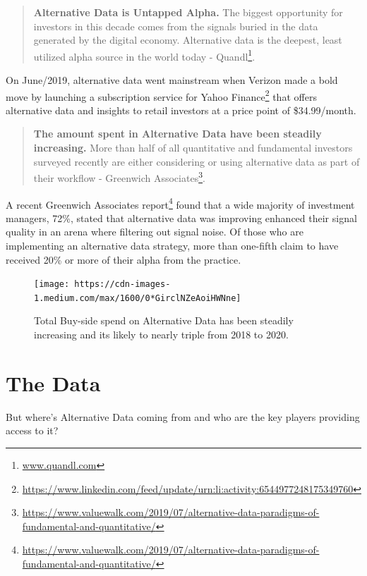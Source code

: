 \documentclass[]{book}
\DeclareRobustCommand{\href}[2]{#2\footnote{\url{#1}}}
\theoremstyle{definition}
\theoremstyle{definition}
\theoremstyle{definition}
\theoremstyle{remark}
\begin{document}
\begin{quote}
\textbf{Alternative Data is Untapped Alpha.} The biggest opportunity for
investors in this decade comes from the signals buried in the data
generated by the digital economy. Alternative data is the deepest, least
utilized alpha source in the world today -
\href{www.quandl.com}{Quandl}.
\end{quote}

On June/2019, alternative data went mainstream when Verizon made a bold
move by launching a
\href{https://www.linkedin.com/feed/update/urn:li:activity:6544977248175349760}{subscription
service for Yahoo Finance} that offers alternative data and insights to
retail investors at a price point of \$34.99/month.

\begin{quote}
\textbf{The amount spent in Alternative Data have been steadily
increasing.} More than half of all quantitative and fundamental
investors surveyed recently are either considering or using alternative
data as part of their workflow -
\href{https://www.valuewalk.com/2019/07/alternative-data-paradigms-of-fundamental-and-quantitative/}{Greenwich
Associates}.
\end{quote}

A recent
\href{https://www.valuewalk.com/2019/07/alternative-data-paradigms-of-fundamental-and-quantitative/}{Greenwich
Associates report} found that a wide majority of investment managers,
72\%, stated that alternative data was improving enhanced their signal
quality in an arena where filtering out signal noise. Of those who are
implementing an alternative data strategy, more than one-fifth claim to
have received 20\% or more of their alpha from the practice.

\begin{figure}[h]

{\centering \texttt{[image: https://cdn-images-1.medium.com/max/1600/0*GirclNZeAoiHWNne]} 

}

\caption{Total Buy-side spend on Alternative Data has been steadily increasing and its likely to nearly triple from 2018 to 2020.}\label{fig:unnamed-chunk-59}
\end{figure}

\section{The Data}\label{the-data}

But where's Alternative Data coming from and who are the key players
providing access to it?
\end{document}
